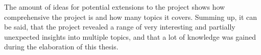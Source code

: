 The amount of ideas for potential extensions to the project shows how comprehensive the project is and how many topics it covers.
Summing up, it can be said, that the project revealed a range of very interesting and partially unexpected insights into multiple topics, and that a lot of knowledge was gained during the elaboration of this thesis.

%




%
%
%
